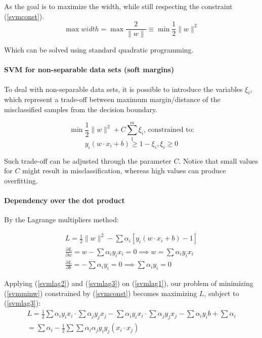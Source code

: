 \documentclass[12pt]{article}
\begin{document}
As the goal is to maximize the width, while still respecting the constraint (\ref{svmconst}).
\begin{equation} \label{svmminw}
	\max width = \max \frac{2}{\|w\|} \equiv \min \frac{1}{2} \|w\|^2
\end{equation}

Which can be solved using standard quadratic programming.

\paragraph{SVM for non-separable data sets (soft margins)}

To deal with non-separable data sets, it is possible to introduce the variables $\xi_i$, \cite{wessvmdef} which represent a trade-off between maximum margin/distance of the misclassified samples from the decision boundary.

$$\min \frac{1}{2} \|w\|^2 + C \sum_{1}^{m}\xi_i \text{, constrained to:}$$
$$y_i(w \cdot x_i +b) \geq 1- \xi_i, \xi_i \geq 0$$

Such trade-off can be adjusted through the parameter $C$. Notice that small values for $C$ might result in misclassification, whereas high values can produce overfitting.

\paragraph{Dependency over the dot product}

By the Lagrange multipliers method: \cite{mitsvm}

\begin{gather} \label{svmlag1}
	L = \frac{1}{2}\|w\|^2 - \sum \alpha_i[y_i(w \cdot x_i +b) -1] \\
	\label{svmlag2}
	\frac{\partial L}{\partial w} = w -\sum\alpha_i y_i x_i = 0 \implies w = \sum\alpha_i y_i x_i \\
	\label{svmlag3}
	\frac{\partial L}{\partial b} = -\sum\alpha_i y_i = 0 \implies \sum\alpha_i y_i = 0
\end{gather}

Applying (\ref{svmlag2}) and (\ref{svmlag3}) on (\ref{svmlag1}), our problem of minimizing (\ref{svmminw}) constrained by (\ref{svmconst}) becomes maximizing $L$, subject to (\ref{svmlag3}):
\begin{gather*}
L = \frac{1}{2}\sum\alpha_i y_i x_i \cdot \sum\alpha_j y_j x_j
- \sum \alpha_i y_i x_i \cdot \sum \alpha_j y_j x_j
- \sum \alpha_i y_i b + \sum \alpha_i \\
= \sum\alpha_i -\frac{1}{2}\sum\sum\alpha_i\alpha_j y_i y_j (x_i \cdot x_j)
\end{gather*}
\end{document}

